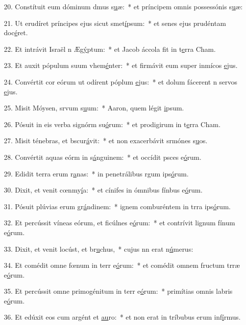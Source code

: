 20. Constítuit eum dóminum dmus s\uline{u}æ:~* et príncipem omnis possessónis s\uline{u}æ:\par 
21. Ut erudíret príncipes ejus sicut smet\uline{í}psum:~* et senes ejus prudéntam doc\uline{é}ret.\par 
22. Et intrávit Israël n Æg\uline{ý}ptum:~* et Jacob áccola fit in t\uline{e}rra Cham.\par 
23. Et auxit pópulum suum vhem\uline{é}nter:~* et firmávit eum super inmícos \uline{e}jus.\par 
24. Convértit cor eórum ut odírent póplum \uline{e}jus:~* et dolum fácerent n servos \uline{e}jus.\par 
25. Misit Móysen, srvum s\uline{u}um:~* Aaron, quem légit \uline{i}psum.\par 
26. Pósuit in eis verba signórm su\uline{ó}rum:~* et prodigirum in t\uline{e}rra Cham.\par 
27. Misit ténebras, et bscur\uline{á}vit:~* et non exacerbávit srmónes s\uline{u}os.\par 
28. Convértit aquas eórm in s\uline{á}nguinem:~* et occídit psces e\uline{ó}rum.\par 
29. Edidit terra erum r\uline{a}nas:~* in penetrálibus rgum ips\uline{ó}rum.\par 
30. Dixit, et venit cœnmy\uline{í}a:~* et cínifes in ómnibus fínbus e\uline{ó}rum.\par 
31. Pósuit plúvias erum gr\uline{á}ndinem:~* ignem comburéntem in trra ips\uline{ó}rum.\par 
32. Et percússit víneas eórum, et ficúlnes e\uline{ó}rum:~* et contrívit lignum fínum e\uline{ó}rum.\par 
33. Dixit, et venit locúst, et br\uline{u}chus,~* cujus nn erat n\uline{ú}merus:\par 
34. Et comédit omne fœnum in terr e\uline{ó}rum:~* et comédit omnem fructum trræ e\uline{ó}rum.\par 
35. Et percússit omne primogénitum in terr e\uline{ó}rum:~* primítias omnis labris e\uline{ó}rum.\par 
36. Et edúxit eos cum argént et \uline{au}ro:~* et non erat in tríbubus erum inf\uline{í}rmus.\par 
